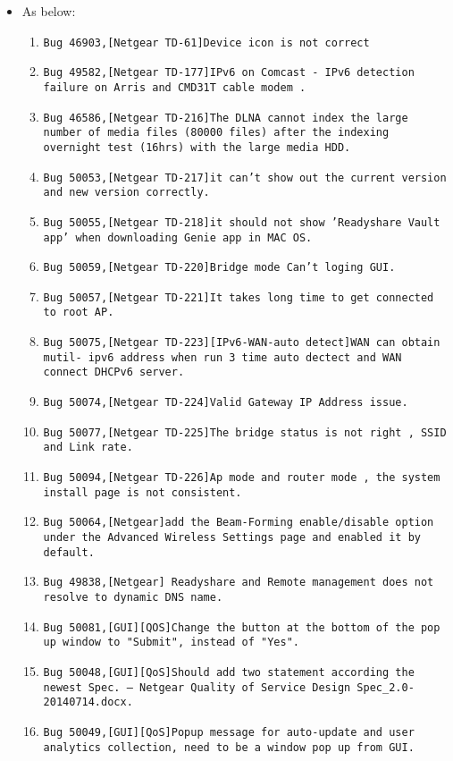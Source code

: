 \documentclass[12pt]{report}
\begin{document}
    \begin{itemize}
    \item As below:
    	\begin{enumerate}
		\item \texttt{Bug 46903,[Netgear TD-61]Device icon is not correct}
		\item \texttt{Bug 49582,[Netgear TD-177]IPv6 on Comcast - IPv6 detection failure on Arris and CMD31T cable modem .}
		\item \texttt{Bug 46586,[Netgear TD-216]The DLNA cannot index the large number of media files (80000 files) after the indexing overnight test (16hrs) with the large media HDD.}
		\item \texttt{Bug 50053,[Netgear TD-217]it can't show out the current version and new version correctly.}
		\item \texttt{Bug 50055,[Netgear TD-218]it should not show 'Readyshare Vault app' when downloading Genie app in MAC OS.}
		\item \texttt{Bug 50059,[Netgear TD-220]Bridge mode Can't loging GUI.}
		\item \texttt{Bug 50057,[Netgear TD-221]It takes long time to get connected to root AP.}
		\item \texttt{Bug 50075,[Netgear TD-223][IPv6-WAN-auto detect]WAN can obtain mutil- ipv6 address when run 3 time auto dectect and WAN connect DHCPv6 server.}
		\item \texttt{Bug 50074,[Netgear TD-224]Valid Gateway IP Address issue.}
		\item \texttt{Bug 50077,[Netgear TD-225]The bridge status is not right , SSID and Link rate.}
		\item \texttt{Bug 50094,[Netgear TD-226]Ap mode and router mode , the system install page is not consistent.}
		\item \texttt{Bug 50064,[Netgear]add the Beam-Forming enable/disable option under the Advanced Wireless Settings page and enabled it by default.}
		\item \texttt{Bug 49838,[Netgear] Readyshare and Remote management does not resolve to dynamic DNS name.}
		\item \texttt{Bug 50081,[GUI][QOS]Change the button at the bottom of the pop up window to "Submit", instead of "Yes".}
		\item \texttt{Bug 50048,[GUI][QoS]Should add two statement according the newest Spec. --- Netgear Quality of Service Design Spec\_2.0-20140714.docx.}
		\item \texttt{Bug 50049,[GUI][QoS]Popup message for auto-update and user analytics collection, need to be a window pop up from GUI.}

\end{enumerate}
\end{itemize}
\end{document}

